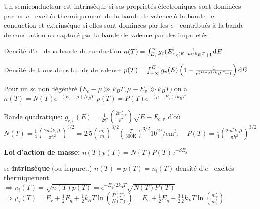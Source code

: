 Un semiconducteur est intrinsèque si ses proprietés électroniques sont dominées par les $e^-$ excités thermiquement de la bande de valence à la bande de conduction et extrinsèque si elles sont dominées par les $e^-$ contribués à la bande de conduction ou capturé par la bande de valence par des impuretés.
\begin{squishlist}
    \item Densité d'$e^-$ dans bande de conduction $n(T) = \int_{E_c}^{\infty} g_c(E) \frac{1}{e^{(E-\mu)/k_B T} + 1} \textrm{d} E$
    \item Densité de trous dans bande de valence $p(T) =\int_{-\infty}^{E_v} g_v(E)\left( 1- \frac{1}{e^{(E-\mu)/k_B T} + 1} \right)\textrm{d} E$
    \item Pour un sc non dégénéré ($E_c - \mu \gg k_B T, \mu -E_v \gg k_B T)$ on a \\ $n(T) = N(T) e^{-(E_c - \mu) / k_B T}$ \quad $p(T) = P(T) e^{-(\mu - E_v) / k_B T}$
    \item Bande quadratique: $g_{c,v}(E) = \frac{1}{2 \pi^2}\left( \frac{2m^*_{c,v}}{\hbar^2}\right) \sqrt{E - E_{c,v}}$
    d'où \\
    $N(T) = \frac{1}{4} \left( \frac{2 m_c^* k_B T}{\pi \hbar^2}\right)^{3/2}=2.5 \left(\frac{m_c^*}{m}\right)^{3/2} \left(\frac{T}{300 \mathrm{K}}\right)^{3/2} 10^{19}/\mathrm{cm}^3; \quad P(T) = \frac{1}{4} \left( \frac{2 m_v^* k_B T}{\pi \hbar^2}\right)^{3/2}$
    \item \textbf{Loi d'action de masse:} $n(T)p(T) = N(T)P(T) e^{-\beta E_g}$
    \item sc \textbf{intrinsèque} (ou impuret.) $n(T) = p(T) = n_i(T)$ \quad densité d'$e^-$ excités thermiquement \\
    $\Longrightarrow n_i(T) = \sqrt{n(T) p(T)} = e^{-E_g / 2 k_B T} \sqrt{N(T) P(T)}$ \\
    $\Longrightarrow \mu_i(T) = E_v + \frac{1}{2}E_g + \frac{1}{2}k_B T \ln \left( \frac{P(T)}{N(T)}\right) = E_v + \frac{1}{2}E_g + \frac{3}{2}\frac{1}{2}k_B T \ln \left( \frac{m_v^*}{m_c^*}\right)$
\end{squishlist}

